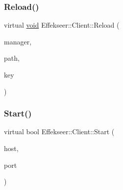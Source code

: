 \mbox{\label{class_effekseer_1_1_client_a82cb4bc702a7cb270dd141fec9f62812}} 
\subsubsection{\texorpdfstring{Reload()}{Reload()}\hspace{0.1cm}{\footnotesize\ttfamily [2/2]}}
{\footnotesize\ttfamily virtual \mbox{\hyperlink{namespace_effekseer_ab34c4088e512200cf4c2716f168deb56}{void}} Effekseer\+::\+Client\+::\+Reload (\begin{DoxyParamCaption}\item[{\mbox{\hyperlink{class_effekseer_1_1_manager}{Manager}} $\ast$}]{manager,  }\item[{const \mbox{\hyperlink{_effekseer_8h_aca7eb5de6dd019c19ac58ea35a193f2f}{E\+F\+K\+\_\+\+C\+H\+AR}} $\ast$}]{path,  }\item[{const \mbox{\hyperlink{_effekseer_8h_aca7eb5de6dd019c19ac58ea35a193f2f}{E\+F\+K\+\_\+\+C\+H\+AR}} $\ast$}]{key }\end{DoxyParamCaption})\hspace{0.3cm}{\ttfamily [pure virtual]}}

\mbox{\label{class_effekseer_1_1_client_a8ccf03136f886a34baeabcfd6d3e5cb4}} 
\subsubsection{\texorpdfstring{Start()}{Start()}}
{\footnotesize\ttfamily virtual bool Effekseer\+::\+Client\+::\+Start (\begin{DoxyParamCaption}\item[{char $\ast$}]{host,  }\item[{uint16\+\_\+t}]{port }\end{DoxyParamCaption})\hspace{0.3cm}{\ttfamily [pure virtual]}}

\mbox{\label{class_effekseer_1_1_client_aa490dfe72eeb567e6eff19d9e8b850c1}} 
